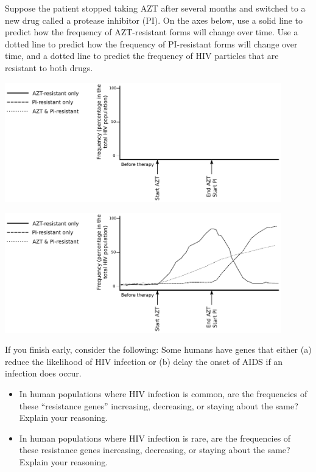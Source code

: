 \documentclass[11pt]{exam}
\begin{document}
\begin{questions}

\question
Suppose the patient stopped taking AZT after several months and switched to a
new drug called a protease inhibitor (PI). On the axes below, use a solid line
to predict how the frequency of AZT-resistant forms will change over time. Use
a dotted line to predict how the frequency of PI-resistant forms will change
over time, and a dotted line to predict the frequency of HIV particles that are
resistant to both drugs.

\includegraphics[width=0.9\textwidth]{../../images/hiv-frequency-plot.pdf}

\begin{solution}
\includegraphics[width=0.9\textwidth]{../../images/hiv-frequency-plot-key.pdf}
\end{solution}

\end{questions}

\begin{center}
\end{center}


If you finish early, consider the following: Some humans have genes that either
(a) reduce the likelihood of HIV infection or (b) delay the onset of AIDS if an
infection does occur.

\begin{itemize}
    \item In human populations where HIV infection is common, are the
        frequencies of these ``resistance genes'' increasing, decreasing, or
        staying about the same? Explain your reasoning.

        \vspace{0.5cm}

    \item In human populations where HIV infection is rare, are the frequencies
        of these resistance genes increasing, decreasing, or staying about the
        same? Explain your reasoning.
\end{itemize}
\end{document}
